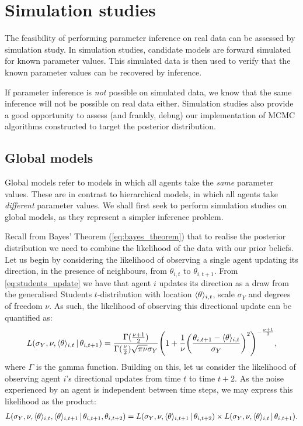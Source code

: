 \graphicspath{{fig/sim_studies/}}

\chapter{Simulation studies}
\label{cha:sim_studies}

The feasibility of performing parameter inference on real data can be assessed
by simulation study. In simulation studies, candidate models are forward
simulated for known parameter values. This simulated data is then used to
verify that the known parameter values can be recovered by inference.

If parameter inference is \emph{not} possible on simulated data, we know that
the same inference will not be possible on real data either. Simulation studies
also provide a good opportunity to assess (and frankly, debug) our
implementation of MCMC algorithms constructed to target the posterior
distribution.

\section{Global models}
\label{sec:global_models}

Global models refer to models in which all agents take the \emph{same}
parameter values. These are in contrast to hierarchical models, in which all
agents take \emph{different} parameter values. We shall first seek to perform
simulation studies on global models, as they represent a simpler inference
problem.

Recall from Bayes' Theorem (\cref{eq:bayes_theorem}) that to realise the
posterior distribution we need to combine the likelihood of the data with our
prior beliefs. Let us begin by considering the likelihood of observing a single
agent updating its direction, in the presence of neighbours, from $\theta_{i,
t}$ to $\theta_{i, t+1}$. From \cref{eq:students_update} we have that agent
$i$ updates its direction as a draw from the generalised Students
$t$-distribution with location $\langle\theta\rangle_{i,t}$, scale $\sigma_Y$ and
degrees of freedom $\nu$. As such, the likelihood of observing this directional
update can be quantified as:
\begin{equation*}
  L(\sigma_Y, \nu, \langle\theta\rangle_{i,t} \,|\, \theta_{i,t+1}) =
  \frac{\Gamma(\frac{\nu +1 }{2})}{\Gamma(\frac{\nu}{2})\sqrt{\pi\nu}\sigma_Y}
  \Bigg(1 + \frac{1}{\nu}
  \bigg(\frac{\theta_{i,t+1}-\langle\theta\rangle_{i,t}}{\sigma_Y}\bigg)^2
  \Bigg)^{-\frac{\nu+1}{2}},
\end{equation*}
where $\Gamma$ is the gamma function. Building on this, let us consider the
likelihood of observing agent $i$'s directional updates from time $t$ to time
$t+2$. As the noise experienced by an agent is independent between time steps,
we may express this likelihood as the product:
\begin{align*}
  L(\sigma_Y,\nu,\langle\theta\rangle_{i,t},\langle\theta\rangle_{i,t+1}\,|\,\theta_{i,t+1},
  \theta_{i,t+2})
  = L(\sigma_Y,\nu,\langle\theta\rangle_{i,t+1}\,|\,\theta_{i,t+2})\times
  L(\sigma_Y,\nu,\langle\theta\rangle_{i,t}\,|\,\theta_{i,t+1}).
\end{align*}

